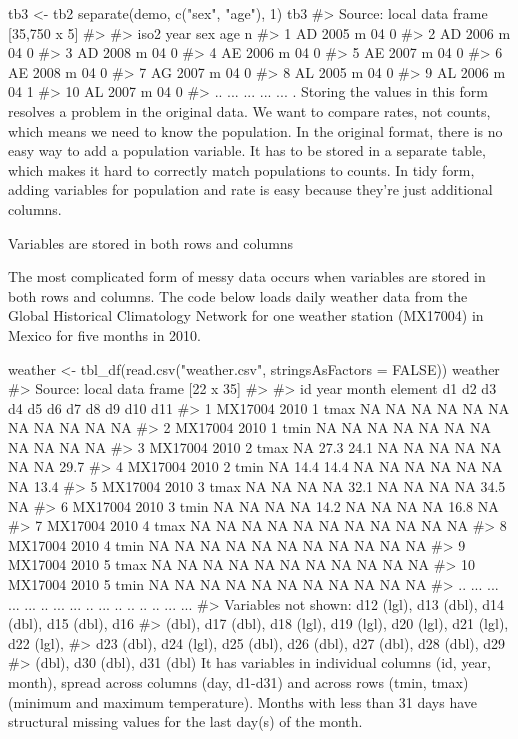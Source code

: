 tb3 <- tb2 %
  separate(demo, c("sex", "age"), 1)
tb3
#> Source: local data frame [35,750 x 5]
#> 
#>    iso2 year sex age n
#> 1    AD 2005   m  04 0
#> 2    AD 2006   m  04 0
#> 3    AD 2008   m  04 0
#> 4    AE 2006   m  04 0
#> 5    AE 2007   m  04 0
#> 6    AE 2008   m  04 0
#> 7    AG 2007   m  04 0
#> 8    AL 2005   m  04 0
#> 9    AL 2006   m  04 1
#> 10   AL 2007   m  04 0
#> ..  ...  ... ... ... .
Storing the values in this form resolves a problem in the original data. We want to compare rates, not counts, which means we need to know the population. In the original format, there is no easy way to add a population variable. It has to be stored in a separate table, which makes it hard to correctly match populations to counts. In tidy form, adding variables for population and rate is easy because they're just additional columns.

Variables are stored in both rows and columns

The most complicated form of messy data occurs when variables are stored in both rows and columns. The code below loads daily weather data from the Global Historical Climatology Network for one weather station (MX17004) in Mexico for five months in 2010.

weather <- tbl_df(read.csv("weather.csv", stringsAsFactors = FALSE))
weather
#> Source: local data frame [22 x 35]
#> 
#>         id year month element d1   d2   d3 d4   d5 d6 d7 d8 d9  d10  d11
#> 1  MX17004 2010     1    tmax NA   NA   NA NA   NA NA NA NA NA   NA   NA
#> 2  MX17004 2010     1    tmin NA   NA   NA NA   NA NA NA NA NA   NA   NA
#> 3  MX17004 2010     2    tmax NA 27.3 24.1 NA   NA NA NA NA NA   NA 29.7
#> 4  MX17004 2010     2    tmin NA 14.4 14.4 NA   NA NA NA NA NA   NA 13.4
#> 5  MX17004 2010     3    tmax NA   NA   NA NA 32.1 NA NA NA NA 34.5   NA
#> 6  MX17004 2010     3    tmin NA   NA   NA NA 14.2 NA NA NA NA 16.8   NA
#> 7  MX17004 2010     4    tmax NA   NA   NA NA   NA NA NA NA NA   NA   NA
#> 8  MX17004 2010     4    tmin NA   NA   NA NA   NA NA NA NA NA   NA   NA
#> 9  MX17004 2010     5    tmax NA   NA   NA NA   NA NA NA NA NA   NA   NA
#> 10 MX17004 2010     5    tmin NA   NA   NA NA   NA NA NA NA NA   NA   NA
#> ..     ...  ...   ...     ... ..  ...  ... ..  ... .. .. .. ..  ...  ...
#> Variables not shown: d12 (lgl), d13 (dbl), d14 (dbl), d15 (dbl), d16
#>   (dbl), d17 (dbl), d18 (lgl), d19 (lgl), d20 (lgl), d21 (lgl), d22 (lgl),
#>   d23 (dbl), d24 (lgl), d25 (dbl), d26 (dbl), d27 (dbl), d28 (dbl), d29
#>   (dbl), d30 (dbl), d31 (dbl)
It has variables in individual columns (id, year, month), spread across columns (day, d1-d31) and across rows (tmin, tmax) (minimum and maximum temperature). Months with less than 31 days have structural missing values for the last day(s) of the month.

